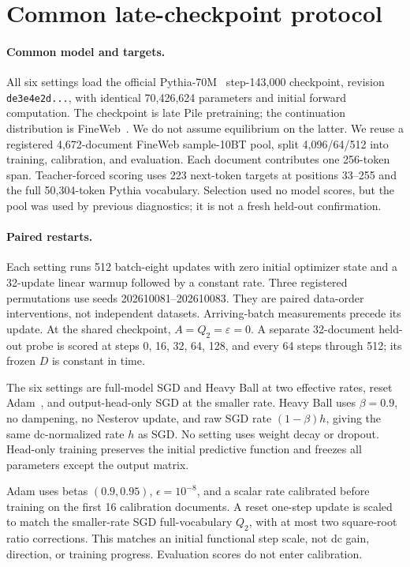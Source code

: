 \section{Common late-checkpoint protocol}

\paragraph{Common model and targets.}
All six settings load the official Pythia-70M~\citep{biderman2023pythiasuiteanalyzinglarge} step-143,000 checkpoint, revision \texttt{de3e4e2d...}, with identical 70,426,624 parameters and initial forward computation.  The checkpoint is late Pile pretraining; the continuation distribution is FineWeb~\citep{penedo2024finewebdatasetsdecantingweb}.  We do not assume equilibrium on the latter.  We reuse a registered 4,672-document FineWeb sample-10BT pool, split 4,096/64/512 into training, calibration, and evaluation.  Each document contributes one 256-token span.  Teacher-forced scoring uses 223 next-token targets at positions 33--255 and the full 50,304-token Pythia vocabulary.  Selection used no model scores, but the pool was used by previous diagnostics; it is not a fresh held-out confirmation.

\paragraph{Paired restarts.}
Each setting runs 512 batch-eight updates with zero initial optimizer state and a 32-update linear warmup followed by a constant rate.  Three registered permutations use seeds 202610081--202610083.  They are paired data-order interventions, not independent datasets.  Arriving-batch measurements precede its update.  At the shared checkpoint, \(A=Q_2=\varepsilon=0\).  A separate 32-document held-out probe is scored at steps 0, 16, 32, 64, 128, and every 64 steps through 512; its frozen \(D\) is constant in time.

The six settings are full-model SGD and Heavy Ball at two effective rates, reset Adam~\citep{kingma2017adammethodstochasticoptimization}, and output-head-only SGD at the smaller rate.  Heavy Ball uses \(\beta=0.9\), no dampening, no Nesterov update, and raw SGD rate \((1-\beta)h\), giving the same dc-normalized rate \(h\) as SGD.  No setting uses weight decay or dropout.  Head-only training preserves the initial predictive function and freezes all parameters except the output matrix.

Adam uses betas \((0.9,0.95)\), \(\epsilon=10^{-8}\), and a scalar rate calibrated before training on the first 16 calibration documents.  A reset one-step update is scaled to match the smaller-rate SGD full-vocabulary \(Q_2\), with at most two square-root ratio corrections.  This matches an initial functional step scale, not dc gain, direction, or training progress.  Evaluation scores do not enter calibration.

